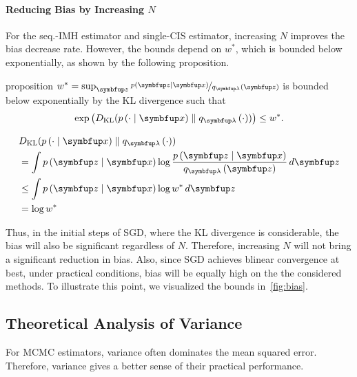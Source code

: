 \paragraph{Reducing Bias by Increasing \(N\)}
For the seq.-IMH estimator and single-CIS estimator, increasing \(N\) improves the bias decrease rate.
However, the bounds depend on \(w^*\), which is bounded below exponentially, as shown by the following proposition.
%
\begin{theoremEnd}{proposition}\label{thm:kl_bound}
  \(w^* = \sup_{\vz} \nicefrac{p\left(\vz\mid\vx\right)}{q_{\vlambda}\left(\vz\right)} \) is bounded below exponentially by the KL divergence such that
  \[
  \exp\left(\DKL{p\left(\cdot\mid\vx\right)}{ q_{\vlambda}\left(\cdot\right) }\right) \leq w^*.
  \]
\end{theoremEnd}
\vspace{-0.1in}
\begin{proofEnd}
  \begin{align*}
    &\DKL{p\left(\cdot\mid\vx\right)}{ q_{\vlambda}\left(\cdot\right) } \\
    &= \int p\left(\vz\mid\vx\right) \log \frac{p\left(\vz\mid\vx\right)}{q_{\vlambda}\left(\vz\right)}\,d\vz \\
    &\leq \int p\left(\vz\mid\vx\right) \log w^* \, d\vz \\
    &= \log w^*
  \end{align*}
\end{proofEnd}

Thus, in the initial steps of SGD, where the KL divergence is considerable, the bias will also be significant regardless of \(N\).
Therefore, increasing \(N\) will not bring a significant reduction in bias.
Also, since SGD achieves blinear convergence at best, under practical conditions, bias will be equally high on the the considered methods.
To illustrate this point, we visualized the bounds in~\cref{fig:bias}.



\vspace{-0.05in}
\subsection{Theoretical Analysis of Variance}
For MCMC estimators, variance often dominates the mean squared error.
Therefore, variance gives a better sense of their practical performance.

\vspace{-0.1in}
